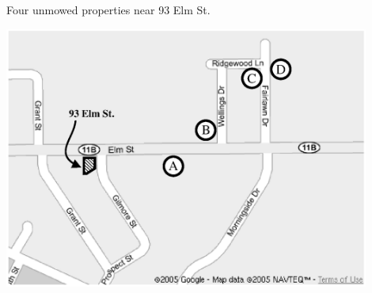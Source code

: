 \documentclass[12pt]{article}
\begin{document}
\begin{center}
{\Huge Four unmowed properties near 93 Elm St.}

\includegraphics[width=0.9\textwidth]{photo_map.eps}

\end{center}
\end{document}
